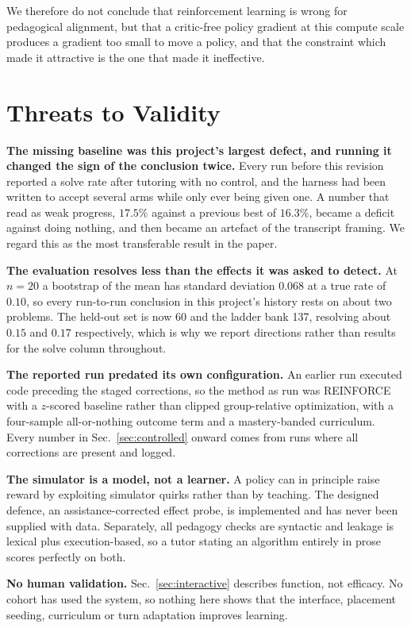 \documentclass[conference]{IEEEtran}
\begin{document}
We therefore do not conclude that reinforcement learning is wrong for
pedagogical alignment, but that a critic-free policy gradient at this compute
scale produces a gradient too small to move a policy, and that the constraint
which made it attractive is the one that made it ineffective.

\section{Threats to Validity}
\label{sec:threats}

\textbf{The missing baseline was this project's largest defect, and running it
changed the sign of the conclusion twice.} Every run before this revision
reported a solve rate after tutoring with no control, and the harness had been
written to accept several arms while only ever being given one. A number that
read as weak progress, $17.5\%$ against a previous best of $16.3\%$, became a
deficit against doing nothing, and then became an artefact of the transcript
framing. We regard this as the most transferable result in the paper.

\textbf{The evaluation resolves less than the effects it was asked to detect.}
At $n{=}20$ a bootstrap of the mean has standard deviation $0.068$ at a true
rate of $0.10$, so every run-to-run conclusion in this project's history rests
on about two problems. The held-out set is now 60 and the ladder bank 137,
resolving about $0.15$ and $0.17$ respectively, which is why we report
directions rather than results for the solve column throughout.

\textbf{The reported run predated its own configuration.} An earlier run
executed code preceding the staged corrections, so the method as run was
REINFORCE with a $z$-scored baseline rather than clipped group-relative
optimization, with a four-sample all-or-nothing outcome term and a
mastery-banded curriculum. Every number in Sec.~\ref{sec:controlled} onward
comes from runs where all corrections are present and logged.

\textbf{The simulator is a model, not a learner.} A policy can in principle
raise reward by exploiting simulator quirks rather than by teaching. The
designed defence, an assistance-corrected effect probe, is implemented and has
never been supplied with data. Separately, all pedagogy checks are syntactic
and leakage is lexical plus execution-based, so a tutor stating an algorithm
entirely in prose scores perfectly on both.

\textbf{No human validation.} Sec.~\ref{sec:interactive} describes function,
not efficacy. No cohort has used the system, so nothing here shows that the
interface, placement seeding, curriculum or turn adaptation improves learning.
\end{document}

